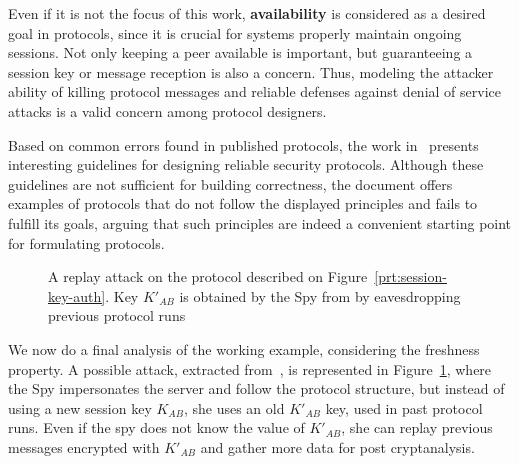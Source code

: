 Even if it is not the focus of this work, \textbf{availability} is considered as a desired goal in protocols, since it is crucial for systems properly maintain ongoing sessions. Not only keeping a peer available is important, but guaranteeing a session key or message reception is also a concern. Thus, modeling the attacker ability of killing protocol messages and reliable defenses against denial of service attacks is a valid concern among protocol designers.

Based on common errors found in published protocols, the work in~\cite{AbadiNeedham96} presents interesting guidelines for designing reliable security protocols. Although these guidelines are not sufficient for building correctness, the document offers examples of protocols that do not follow the displayed principles and fails to fulfill its goals, arguing that such principles are indeed a convenient starting point for formulating protocols.

\begin{figure}[!ht]\label{fig:attack-ex-replay}
  \centering

  \caption{A replay attack on the protocol described on Figure~\ref{prt:session-key-auth}. Key \(K'_{AB}\) is obtained by the Spy from by eavesdropping previous protocol runs}
\end{figure}

We now do a final analysis of the working example, considering the freshness property. A possible attack, extracted from~\cite{BoydMathuria2008}, is represented in Figure~\ref{fig:attack-ex-replay}, where the Spy impersonates the server and follow the protocol structure, but instead of using a new session key \(K_{AB}\), she uses an old \(K'_{AB}\) key, used in past protocol runs. Even if the spy does not know the value of \(K'_{AB}\), she can replay previous messages encrypted with \(K'_{AB}\) and gather more data for post cryptanalysis.

